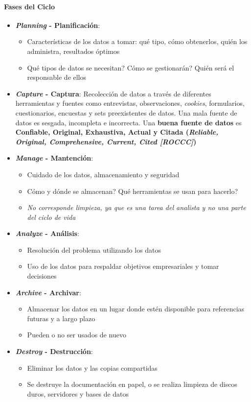 \paragraph{Fases del Ciclo}
\begin{itemize}
    \item {\textbf{\textit{Planning} - Planificación}:
    \begin{itemize}
        \item {Características de los datos a tomar: qué tipo, cómo obtenerlos, quién los administra, resultados óptimos}
        \item {Qué tipos de datos se necesitan? Cómo se gestionarán? Quién será el responsable de ellos}
    \end{itemize}}
    \item {\textbf{\textit{Capture} - Captura}: Recolección de datos a través de diferentes herramientas y fuentes como entrevistas, observaciones, \textit{cookies}, formularios, cuestionarios, encuestas y sets preexistentes de datos. Una mala fuente de datos es sesgada, incompleta e incorrecta. Una \textbf{buena fuente de datos} es \textbf{Confiable, Original, Exhaustiva, Actual y Citada (\textit{Reliable, Original, Comprehensive, Current, Cited [ROCCC]})}}
    \item {\textbf{\textit{Manage} - Mantención}:
    \begin{itemize}
        \item {Cuidado de los datos, almacenamiento y seguridad}
        \item {Cómo y dónde se almacenan? Qué herramientas se usan para hacerlo?}
        \item {\textit{No corresponde limpieza, ya que es una tarea del analista y no una parte del ciclo de vida}}
    \end{itemize}}
    \item {\textbf{\textit{Analyze} - Análisis}:
    \begin{itemize}
        \item {Resolución del problema utilizando los datos}
        \item {Uso de los datos para respaldar objetivos empresariales y tomar decisiones}
    \end{itemize}}
    \item {\textbf{\textit{Archive} - Archivar}:
    \begin{itemize}
        \item {Almacenar los datos en un lugar donde estén disponible para referencias futuras y a largo plazo}
        \item {Pueden o no ser usados de nuevo}
    \end{itemize}}
    \item {\textbf{\textit{Destroy} - Destrucción}:
    \begin{itemize}
       \item {Eliminar los datos y las copias compartidas}
       \item {Se destruye la documentación en papel, o se realiza limpieza de discos duros, servidores y bases de datos}
    \end{itemize}}
\end{itemize}

